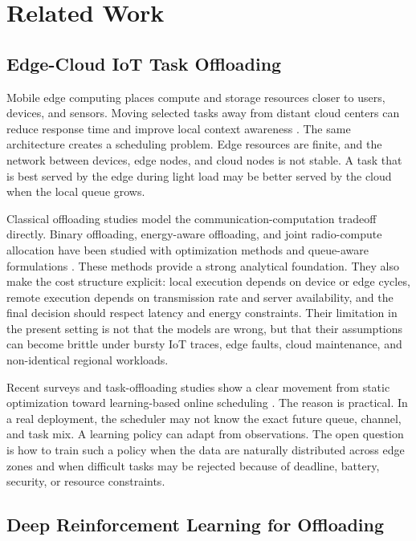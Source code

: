 \section{Related Work}
\label{sec:related_work}

\subsection{Edge-Cloud IoT Task Offloading}

Mobile edge computing places compute and storage resources closer to users, devices, and sensors. Moving selected tasks away from distant cloud centers can reduce response time and improve local context awareness \cite{ref24,ref28}. The same architecture creates a scheduling problem. Edge resources are finite, and the network between devices, edge nodes, and cloud nodes is not stable. A task that is best served by the edge during light load may be better served by the cloud when the local queue grows.

Classical offloading studies model the communication-computation tradeoff directly. Binary offloading, energy-aware offloading, and joint radio-compute allocation have been studied with optimization methods and queue-aware formulations \cite{ref17,ref18,ref19}. These methods provide a strong analytical foundation. They also make the cost structure explicit: local execution depends on device or edge cycles, remote execution depends on transmission rate and server availability, and the final decision should respect latency and energy constraints. Their limitation in the present setting is not that the models are wrong, but that their assumptions can become brittle under bursty IoT traces, edge faults, cloud maintenance, and non-identical regional workloads.

Recent surveys and task-offloading studies show a clear movement from static optimization toward learning-based online scheduling \cite{ref12,ref28}. The reason is practical. In a real deployment, the scheduler may not know the exact future queue, channel, and task mix. A learning policy can adapt from observations. The open question is how to train such a policy when the data are naturally distributed across edge zones and when difficult tasks may be rejected because of deadline, battery, security, or resource constraints.

\subsection{Deep Reinforcement Learning for Offloading}

